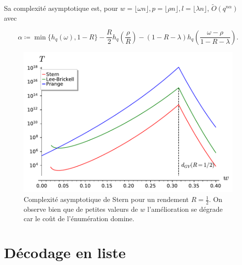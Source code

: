 \documentclass[a4paper,11pt,headings=small,footinclude=false]{scrartcl}
\theoremstyle{definition}
\theoremstyle{remark}
\begin{document}
Sa complexité asymptotique est, pour $w=\lfloor \omega n \rfloor, p = \lfloor \rho n \rfloor, l= \lfloor \lambda  n \rfloor$, $\tilde{O}(q^{n\alpha})$ avec

\[
	\alpha \coloneq \min\{ h_q(\omega), 1-R \} -\frac{R}{2} h_q(\frac{\rho}{R}) - (1-R-\lambda)h_q(\frac{\omega - \rho}{1 - R - \lambda}).
\]

\begin{figure}[h!]
\centering
\includegraphics{decodage_syndrome/Stern.pdf}
\caption{Complexité asymptotique de Stern pour un rendement $R=\frac{1}{2}$. On observe bien que de petites valeurs de $w$ l'amélioration se dégrade car le coût de l'énumération domine.}
\label{fig:prange}
\end{figure}

\newpage
\section{Décodage en liste}
\end{document}
